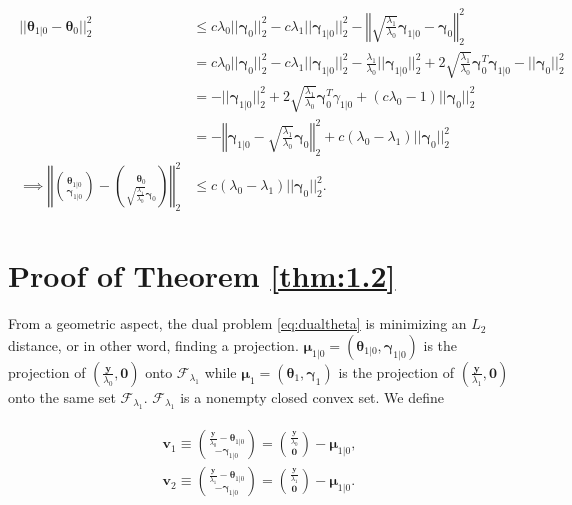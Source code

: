 \begin{gather}
    \begin{aligned}
        ||\boldsymbol\theta_{1|0}-\boldsymbol\theta_{0}||_2^2&\leq c\lambda_0||\boldsymbol\gamma_{0}||_2^2-c\lambda_1||\boldsymbol\gamma_{1|0}||_2^2-\left\Vert\sqrt{\frac{\lambda_1}{\lambda_0}}\boldsymbol\gamma_{1|0}-\boldsymbol\gamma_{0}\right\Vert_2^2\\
        &=c\lambda_0||\boldsymbol\gamma_{0}||_2^2-c\lambda_1||\boldsymbol\gamma_{1|0}||_2^2-\frac{\lambda_1}{\lambda_0}||\boldsymbol\gamma_{1|0}||_2^2+2\sqrt{\frac{\lambda_1}{\lambda_0}}\boldsymbol\gamma_{0}^T\boldsymbol\gamma_{1|0}-||\boldsymbol\gamma_{0}||_2^2\\
        &=-||\boldsymbol\gamma_{1|0}||_2^2+2\sqrt{\frac{\lambda_1}{\lambda_0}}\boldsymbol\gamma_{0}^T\gamma_{1|0}+(c\lambda_0-1)||\boldsymbol\gamma_{0}||_2^2\\
        &=-\left\Vert\boldsymbol\gamma_{1|0}-\sqrt{\frac{\lambda_1}{\lambda_0}}\boldsymbol\gamma_{0}\right\Vert_2^2+c(\lambda_0-\lambda_1)||\boldsymbol\gamma_{0}||_2^2\\
        \implies \left\Vert\binom{\boldsymbol\theta_{1|0}}{\boldsymbol\gamma_{1|0}}-\binom{\boldsymbol\theta_{0}}{\sqrt{\frac{\lambda_1}{\lambda_0}}\boldsymbol\gamma_{0}}\right\Vert_2^2&\leq c(\lambda_0-\lambda_1)||\boldsymbol\gamma_{0}||_2^2.
    \end{aligned}
\end{gather}

\section{Proof of Theorem \ref{thm:1.2}}

From a geometric aspect, the dual problem \eqref{eq:dualtheta} is minimizing an $L_2$ distance, or in other word, finding a projection. $\boldsymbol\mu_{1|0}=(\boldsymbol \theta_{1|0},\boldsymbol \gamma_{1|0})$ is the projection of $(\frac{\boldsymbol y}{\lambda_0},\boldsymbol0)$ onto $\mathcal{F}_{\lambda_1}$ while $\boldsymbol\mu_1=(\boldsymbol \theta_{1},\boldsymbol \gamma_{1})$ is the projection of $(\frac{\boldsymbol y}{\lambda_1},\boldsymbol0)$ onto the same set $\mathcal{F}_{\lambda_1}$. $\mathcal{F}_{\lambda_1}$ is a nonempty closed convex set. We define

\begin{gather}
    \label{eq:1.2.1}
    \begin{aligned}
        \boldsymbol v_1\equiv\binom{\frac{\boldsymbol y}{\lambda_0}-\boldsymbol \theta_{1|0}}{-\boldsymbol \gamma_{1|0}}=\binom{\frac{\boldsymbol y}{\lambda_0}}{\boldsymbol0}-\boldsymbol\mu_{1|0},\\
        \boldsymbol v_2\equiv \binom{\frac{\boldsymbol y}{\lambda_1}-\boldsymbol \theta_{1|0}}{-\boldsymbol \gamma_{1|0}}=\binom{\frac{\boldsymbol y}{\lambda_1}}{\boldsymbol0}-\boldsymbol\mu_{1|0}.
    \end{aligned}
\end{gather}

